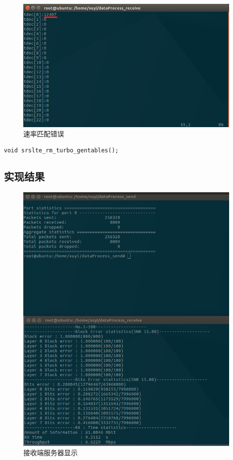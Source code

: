 \documentclass{article}
\begin{document}
\begin{figure}[H]
	\centering
	\includegraphics[width = .6\textwidth]{tdec_error.png}
	\caption{速率匹配错误}
\end{figure}
\begin{lstlisting}
void srslte_rm_turbo_gentables();
\end{lstlisting}
\subsection{实现结果}
\begin{figure}[H]
	\centering
	\includegraphics[width = .6\textwidth]{result1.png}
	\caption{接收端服务器显示}
\end{figure}

\end{document}

